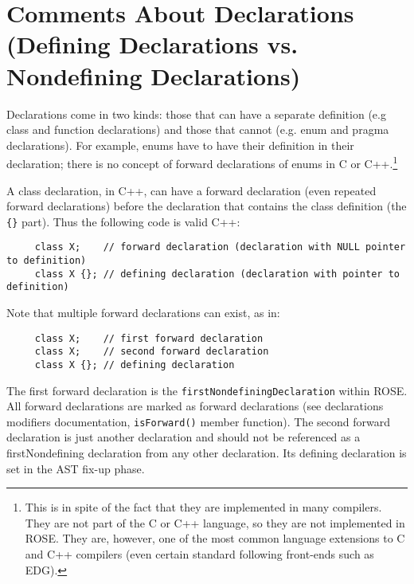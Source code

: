 \section{Comments About Declarations (Defining Declarations vs. Nondefining
    Declarations) }

    Declarations come in two kinds: those that can have a separate definition (e.g class
and function declarations) and those that cannot (e.g. enum and pragma declarations).
For example, enums have to have their definition in their declaration; there is no concept of
forward declarations of enums in C or C++.\footnote{This is in spite of the fact that they
    are implemented in many compilers. They are not part of the C or C++ language, so 
they are not implemented in ROSE.  They are, however, one of the most common language
extensions to C and C++ compilers (even certain standard following front-ends such as EDG).}

A class declaration, in C++, can have a forward declaration (even repeated forward declarations)
before the declaration that contains the class definition (the {\tt \{\}} part).  Thus 
the following code is valid C++:
{\indent
{\mySmallFontSize
\begin{verbatim}
     class X;    // forward declaration (declaration with NULL pointer to definition)
     class X {}; // defining declaration (declaration with pointer to definition)
\end{verbatim}
}}
Note that multiple forward declarations can exist, as in:
{\indent
{\mySmallFontSize
\begin{verbatim}
     class X;    // first forward declaration
     class X;    // second forward declaration
     class X {}; // defining declaration
\end{verbatim}
}}
   The first forward declaration is the {\tt firstNondefiningDeclaration} within ROSE.
All forward declarations are marked as forward declarations (see declarations modifiers
documentation, {\tt isForward()} member function). The second forward declaration is just 
another declaration and should not be referenced as a firstNondefining declaration from
any other declaration. Its defining declaration is set in the AST fix-up phase.

